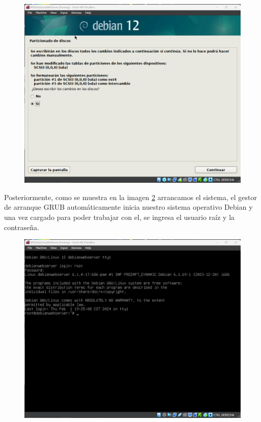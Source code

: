 \documentclass[12pt,a4paper]{article}
\begin{document}
\begin{itemize}
\begin{figure}[H]
    \centering
    \includegraphics[width=1\linewidth]{M3_Virtualización_y_Contenedores/Tarea_2_Máquina_Virtual_Local/reporte/figuras/3-2_Máquina_Virtual_de_Debian.png}
    \label{fig:Instalación_Debian_2}
\end{figure}

\vspace{1em}

Posteriormente, como se muestra en la imagen \ref{fig:Instalación_Debian_3} arrancamos el sistema, el gestor de arranque GRUB automáticamente inicia nuestro sistema operativo Debian y una vez cargado para poder trabajar con el, se ingresa el usuario raíz y la contraseña.

\begin{figure}[H]
    \centering
    \includegraphics[width=1\linewidth]{M3_Virtualización_y_Contenedores/Tarea_2_Máquina_Virtual_Local/reporte/figuras/3-3_Máquina_Virtual_de_Debian.png}
    \label{fig:Instalación_Debian_3}
\end{figure}



\end{itemize}
\end{document}
